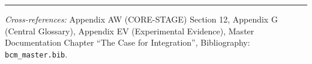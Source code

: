
\vspace{1em}
\hrule
\vspace{0.5em}

\noindent\textit{Cross-references:}
Appendix AW (CORE-STAGE) Section 12,
Appendix G (Central Glossary),
Appendix EV (Experimental Evidence),
Master Documentation Chapter ``The Case for Integration'',
Bibliography: \texttt{bcm\_master.bib}.

